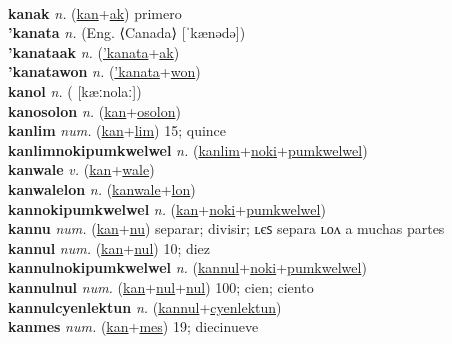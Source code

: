  \label{'kanawon} \\
\textbf{kanak} \textit{n.} (\hyperref[kan]{kan}+\hyperref[ak]{ak})
primero \label{kanak} \\
\textbf{'kanata} \textit{n.} (Eng. ⟨Canada⟩ [ˈkænədə])
 \label{'kanata} \\
\textbf{'kanataak} \textit{n.} (\hyperref['kanata]{'kanata}+\hyperref[ak]{ak})
 \label{'kanataak} \\
\textbf{'kanatawon} \textit{n.} (\hyperref['kanata]{'kanata}+\hyperref[won]{won})
 \label{'kanatawon} \\
\textbf{kanol} \textit{n.} ( [kæːnolaː])
 \label{kanol} \\
\textbf{kanosolon} \textit{n.} (\hyperref[kan]{kan}+\hyperref[osolon]{osolon})
 \label{kanosolon} \\
\textbf{kanlim} \textit{num.} (\hyperref[kan]{kan}+\hyperref[lim]{lim})
15; quince \label{kanlim} \\
\textbf{kanlimnokipumkwelwel} \textit{n.} (\hyperref[kanlim]{kanlim}+\hyperref[noki]{noki}+\hyperref[pumkwelwel]{pumkwelwel})
 \label{kanlimnokipumkwelwel} \\
\textbf{kanwale} \textit{v.} (\hyperref[kan]{kan}+\hyperref[wale]{wale})
 \label{kanwale} \\
\textbf{kanwalelon} \textit{n.} (\hyperref[kanwale]{kanwale}+\hyperref[lon]{lon})
 \label{kanwalelon} \\
\textbf{kannokipumkwelwel} \textit{n.} (\hyperref[kan]{kan}+\hyperref[noki]{noki}+\hyperref[pumkwelwel]{pumkwelwel})
 \label{kannokipumkwelwel} \\
\textbf{kannu} \textit{num.} (\hyperref[kan]{kan}+\hyperref[nu]{nu})
separar; divisir; ʟєꜱ separa ʟᴏᴧ a muchas partes \label{kannu} \\
\textbf{kannul} \textit{num.} (\hyperref[kan]{kan}+\hyperref[nul]{nul})
10; diez \label{kannul} \\
\textbf{kannulnokipumkwelwel} \textit{n.} (\hyperref[kannul]{kannul}+\hyperref[noki]{noki}+\hyperref[pumkwelwel]{pumkwelwel})
 \label{kannulnokipumkwelwel} \\
\textbf{kannulnul} \textit{num.} (\hyperref[kan]{kan}+\hyperref[nul]{nul}+\hyperref[nul]{nul})
100; cien; ciento \label{kannulnul} \\
\textbf{kannulcyenlektun} \textit{n.} (\hyperref[kannul]{kannul}+\hyperref[cyenlektun]{cyenlektun})
 \label{kannulcyenlektun} \\
\textbf{kanmes} \textit{num.} (\hyperref[kan]{kan}+\hyperref[mes]{mes})
19; diecinueve \label{kanmes} \\
